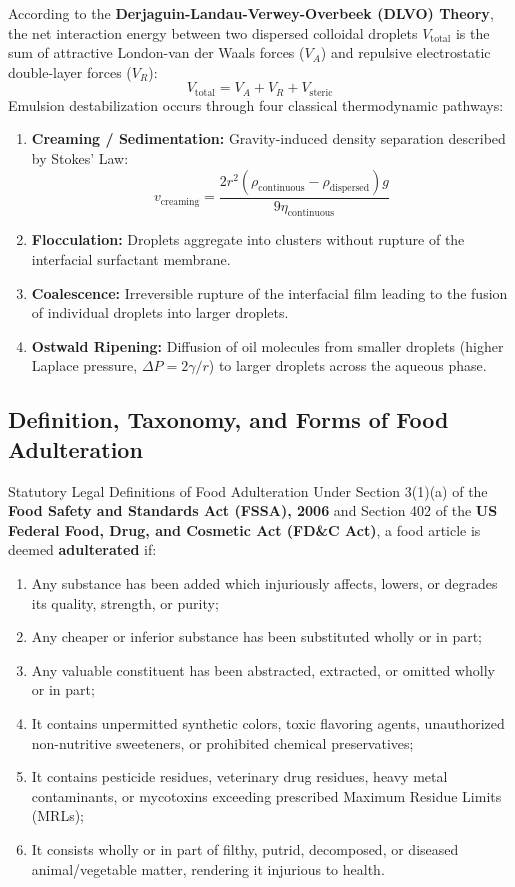 \documentclass[11pt,a4paper,oneside]{article}
\begin{document}
According to the \textbf{Derjaguin-Landau-Verwey-Overbeek (DLVO) Theory}, the net interaction energy between two dispersed colloidal droplets $V_{\text{total}}$ is the sum of attractive London-van der Waals forces ($V_A$) and repulsive electrostatic double-layer forces ($V_R$):
$$V_{\text{total}} = V_A + V_R + V_{\text{steric}}$$
Emulsion destabilization occurs through four classical thermodynamic pathways:
\begin{enumerate}
    \item \textbf{Creaming / Sedimentation:} Gravity-induced density separation described by Stokes' Law:
    $$v_{\text{creaming}} = \frac{2 r^2 (\rho_{\text{continuous}} - \rho_{\text{dispersed}}) g}{9 \eta_{\text{continuous}}}$$
    \item \textbf{Flocculation:} Droplets aggregate into clusters without rupture of the interfacial surfactant membrane.
    \item \textbf{Coalescence:} Irreversible rupture of the interfacial film leading to the fusion of individual droplets into larger droplets.
    \item \textbf{Ostwald Ripening:} Diffusion of oil molecules from smaller droplets (higher Laplace pressure, $\Delta P = 2\gamma/r$) to larger droplets across the aqueous phase.
\end{enumerate}

\subsection{Definition, Taxonomy, and Forms of Food Adulteration}

\begin{defbox}{Statutory Legal Definitions of Food Adulteration}
Under Section 3(1)(a) of the \textbf{Food Safety and Standards Act (FSSA), 2006} and Section 402 of the \textbf{US Federal Food, Drug, and Cosmetic Act (FD\&C Act)}, a food article is deemed \textbf{adulterated} if:
\begin{enumerate}[label=(\roman*)]
    \item Any substance has been added which injuriously affects, lowers, or degrades its quality, strength, or purity;
    \item Any cheaper or inferior substance has been substituted wholly or in part;
    \item Any valuable constituent has been abstracted, extracted, or omitted wholly or in part;
    \item It contains unpermitted synthetic colors, toxic flavoring agents, unauthorized non-nutritive sweeteners, or prohibited chemical preservatives;
    \item It contains pesticide residues, veterinary drug residues, heavy metal contaminants, or mycotoxins exceeding prescribed Maximum Residue Limits (MRLs);
    \item It consists wholly or in part of filthy, putrid, decomposed, or diseased animal/vegetable matter, rendering it injurious to health.
\end{enumerate}
\end{defbox}
\end{document}

